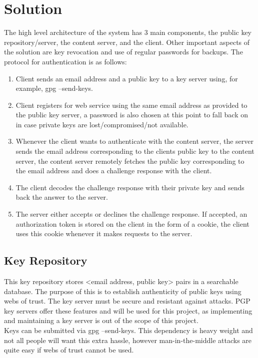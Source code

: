 \documentclass[11pt]{article}
\begin{document}
\section{Solution} \label{sec:sol}
The high level architecture of the system has 3 main components, the public key repository/server, the content server, and the client. Other important aspects of the solution are key revocation and use of regular passwords for backups. The protocol for authentication is as follows:
\begin{enumerate}
	\item Client sends an email address and a public key to a key server using, for example, gpg --send-keys.
	\item Client registers for web service using the same email address as provided to the public key server, a password is also chosen at this point to fall back on in case private keys are lost/compromised/not available.
	\item Whenever the client wants to authenticate with the content server, the server sends the email address corresponding to the clients public key to the content server, the content server remotely fetches the public key corresponding to the email address and does a challenge response with the client.
	\item The client decodes the challenge response with their private key and sends back the answer to the server.
	\item The server either accepts or declines the challenge response. If accepted, an authorization token is stored on the client in the form of a cookie, the client uses this cookie whenever it makes requests to the server.
\end{enumerate}

\subsection{Key Repository} \label{sec:sol_key_repository}
This key repository stores <email address, public key> pairs in a searchable database. The purpose of this is to establish authenticity of public keys using webs of trust. The key server must be secure and resistant against attacks. PGP key servers offer these features and will be used for this project, as implementing and maintaining a key server is out of the scope of this project. \\
Keys can be submitted via gpg --send-keys. This dependency is heavy weight and not all people will want this extra hassle, however man-in-the-middle attacks are quite easy if webs of trust cannot be used. \\
\end{document}
